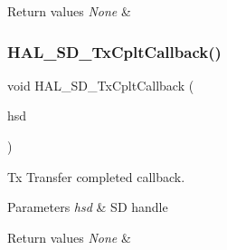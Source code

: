 \begin{DoxyRetVals}{Return values}
{\em None} & \\
\hline
\end{DoxyRetVals}
\mbox{\label{group___s_d___exported___functions___group2_ga7f42b31026c697fea97c132e9aed15e2}} 
\subsubsection{\texorpdfstring{HAL\_SD\_TxCpltCallback()}{HAL\_SD\_TxCpltCallback()}}
{\footnotesize\ttfamily void H\+A\+L\+\_\+\+S\+D\+\_\+\+Tx\+Cplt\+Callback (\begin{DoxyParamCaption}\item[{\mbox{\hyperlink{group___s_d___exported___types___group3_ga1f31eb64a86b0c740bb5c02fa4c9914d}{S\+D\+\_\+\+Handle\+Type\+Def}} $\ast$}]{hsd }\end{DoxyParamCaption})}



Tx Transfer completed callback. 


\begin{DoxyParams}{Parameters}
{\em hsd} & SD handle \\
\hline
\end{DoxyParams}

\begin{DoxyRetVals}{Return values}
{\em None} & \\
\hline
\end{DoxyRetVals}
